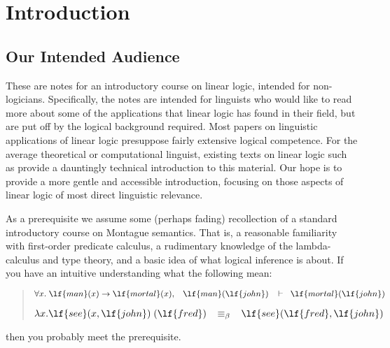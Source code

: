 \chapter{Introduction} \label{CH0}\label{Ch0}

\section{Our Intended Audience}

These are notes for an introductory course on linear logic, 
intended for non-logicians.  Specifically, the
notes are intended for linguists who would like to read more about
some of the applications that linear logic has found in their field,
but are put off by the logical background required.
Most papers on linguistic applications of linear logic presuppose
fairly extensive logical competence.
For the average theoretical or computational 
linguist, existing texts on linear logic such
as \cite{Troelstra} provide a dauntingly technical introduction to
this material. Our hope is to provide a more gentle and accessible
introduction, focusing on those aspects of linear logic of most direct
linguistic relevance.

As a prerequisite we assume some (perhaps fading) recollection of
a standard introductory course on Montague semantics.  
That is, a reasonable familiarity
with first-order predicate calculus, a rudimentary knowledge of the
lambda-calculus and type theory, and a basic idea of what logical
inference is about.  If you have an intuitive understanding what the
following mean: 
\begin{quote}
$\forall x.\; \lf{man}(x)\rightarrow \lf{mortal}(x), \;\;\;
\lf{man}(\lf{john}) \;\;\;\vdash \;\; \lf{mortal}(\lf{john})$

$\lambda x. \lf{see}(x,\lf{john})\;(\lf{fred}) \;\;\; \equiv_\beta \;\;\;
\lf{see}(\lf{fred},\lf{john})$
\end{quote}
then you probably meet the prerequisite.


